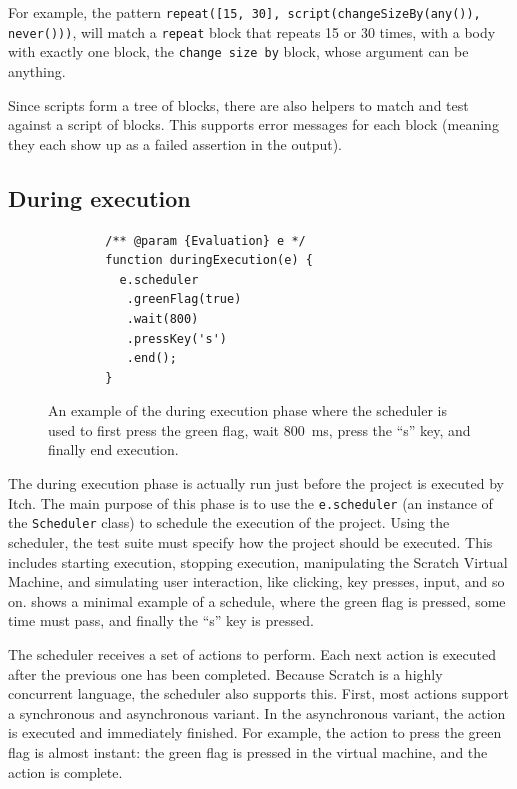 \documentclass[../main]{subfiles}
\begin{document}
For example, the pattern \texttt{repeat([15, 30], script(changeSizeBy(any()), never()))}, will match a \texttt{repeat} block that repeats 15 or 30 times, with a body with exactly one block, the \texttt{change size by} block, whose argument can be anything.

Since scripts form a tree of blocks, there are also helpers to match and test against a script of blocks.
This supports error messages for each block (meaning they each show up as a failed assertion in the output).

\subsection{During execution}\label{subsec:during-execution}

\begin{figure}
    \begin{verbatim}
        /** @param {Evaluation} e */
        function duringExecution(e) {
          e.scheduler
           .greenFlag(true)
           .wait(800)
           .pressKey('s')
           .end();
        }
    \end{verbatim}
    \caption{An example of the during execution phase where the scheduler is used to first press the green flag, wait \qty{800}{\milli\second}, press the ``s'' key, and finally end execution.}\label{fig:itch-scheduler-example}
\end{figure}

The during execution phase is actually run just before the project is executed by Itch.
The main purpose of this phase is to use the \texttt{e.scheduler} (an instance of the \texttt{Scheduler} class) to schedule the execution of the project.
Using the scheduler, the test suite must specify how the project should be executed.
This includes starting execution, stopping execution, manipulating the Scratch Virtual Machine, and simulating user interaction, like clicking, key presses, input, and so on.
 shows a minimal example of a schedule, where the green flag is pressed, some time must pass, and finally the ``s'' key is pressed.

The scheduler receives a set of actions to perform.
Each next action is executed after the previous one has been completed.
Because Scratch is a highly concurrent language, the scheduler also supports this.
First, most actions support a synchronous and asynchronous variant.
In the asynchronous variant, the action is executed and immediately finished.
For example, the action to press the green flag is almost instant: the green flag is pressed in the virtual machine, and the action is complete.
\end{document}
